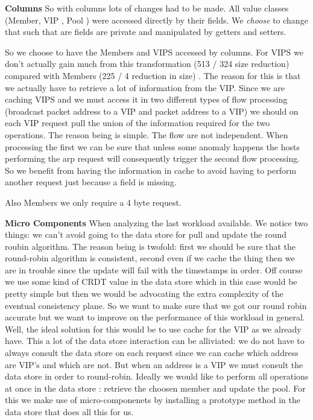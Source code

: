 \documentclass[12pt,openright,twoside]{report}
\begin{document}
\textbf{Columns} 
So with columns lots of changes had to be made.
All value classes (Member, VIP , Pool ) were accessed directly by
their fields.  We \emph{choose} to change that such that are fields
are private and manipulated by getters and setters. 

So we choose to have the Members and VIPS accessed by columns. 
For VIPS we don't actually gain much from this transformation (513 /
324 size reduction)   compared with Members (225 / 4 reduction in
size) . The reason for this is that we actually have to retrieve a lot
of information from the VIP. Since we are caching VIPS and we must
access it in two different types of flow processing (broadcast packet
address to a VIP and packet address to a  VIP) we should on each VIP
request  pull the union of the information required for the two
operations. The reason being is simple. The flow are not
independent. When processing the first we can be sure that unless some
anomaly happens the hosts performing the arp request will consequently
trigger the second flow processing. So we benefit from having the
information in cache to avoid having to perform another request just
because a field is missing. 

Also Members we only require a 4 byte request. 


\textbf{Micro Components} When analyzing the last workload available. We notice two things: we
can't avoid going to the data store for pull and update the round
roubin algorithm. The reason being is twofold: first we should be
sure that the round-robin algorithm is consistent, second even if we
cache the thing then we are in trouble since the update will fail with
the timestamps in order. Off course we use some kind of CRDT value in
the data store which in this case would be pretty simple but then we
would be advocating the extra complexity of the eventual consistency
plane.  So we want to make sure that we got our round robin accurate
but we want to improve on the performance of this workload in
general.  Well, the ideal solution for this would be to use cache for
the VIP as we already have. This a lot of the data store interaction
can be alliviated: we do not have to always consult the data store on
each request since we can cache which address are VIP's and which are
not.  But when an address is a VIP we must consult the data store in
order to round-robin. Ideally we would like to perform all operations
at once in the data store : retrieve the choosen member and update the
pool.  For this we make use of micro-componenets by installing a
prototype method in the data store that does all this for us. 
\end{document}
